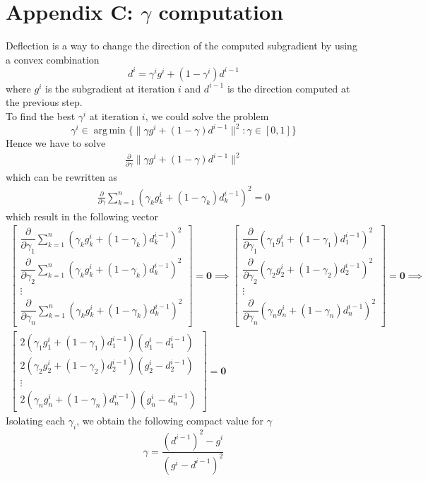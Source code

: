 \documentclass[notitlepage]{article}
\DeclareMathOperator*{\argmin}{arg\,min}
\begin{document}
\section{Appendix C: \texorpdfstring{$\gamma$}{TEXT} computation}
\label{sec:appendix_C}
Deflection is a way to change the direction of the computed subgradient by using a convex combination
\[
  d^i = \gamma^i g^i + (1 - \gamma^i) d^{i-1}   
\]
where $g^i$ is the subgradient at iteration $i$ and $d^{i-1}$ is the direction computed at the previous step.\\
To find the best $\gamma^i$ at iteration $i$, we could solve the problem 
\[
  \gamma^i \in \argmin{ \{ \| \gamma g^i + (1 - \gamma) d^{i-1} \|^2 : \gamma \in \left[0,1\right] \} }   
\]
Hence we have to solve
\begin{align*}
  \frac{\partial}{\partial \gamma} \| \gamma g^i + (1 - \gamma) d^{i-1} \|^2
\end{align*}
which can be rewritten as
\begin{align*}
  \frac{\partial}{\partial \gamma} \sum_{k=1}^n (\gamma_k g_k^i + (1 - \gamma_k) d_k^{i-1})^2 = 0
\end{align*}
which result in the following vector
\begin{gather*}
  \begin{bmatrix}
    \dfrac{\partial}{\partial \gamma_1} \sum_{k=1}^n (\gamma_k g_k^i + (1 - \gamma_k) d_k^{i-1})^2 \\[3ex]
    \dfrac{\partial}{\partial \gamma_2} \sum_{k=1}^n (\gamma_k g_k^i + (1 - \gamma_k) d_k^{i-1})^2 \\[3ex]
    \vdots \\[3ex]
    \dfrac{\partial}{\partial \gamma_n} \sum_{k=1}^n (\gamma_k g_k^i + (1 - \gamma_k) d_k^{i-1})^2
  \end{bmatrix}
  = \boldsymbol{0} \boldsymbol{\implies} 
  \begin{bmatrix}
    \dfrac{\partial}{\partial \gamma_1} (\gamma_1 g_1^i + (1 - \gamma_1) d_1^{i-1})^2 \\[3ex]
    \dfrac{\partial}{\partial \gamma_2} (\gamma_2 g_2^i + (1 - \gamma_2) d_2^{i-1})^2 \\[3ex]
    \vdots \\[3ex]
    \dfrac{\partial}{\partial \gamma_n} (\gamma_n g_n^i + (1 - \gamma_n) d_n^{i-1})^2
  \end{bmatrix}
  = \boldsymbol{0} \boldsymbol{\implies} \\[2ex]
  \begin{bmatrix}
    2 (\gamma_1 g_1^i + (1 - \gamma_1) d_1^{i-1}) (g_1^i - d_1^{i-1}) \\[3ex]
    2 (\gamma_2 g_2^i + (1 - \gamma_2) d_2^{i-1}) (g_2^i - d_2^{i-1}) \\[3ex]
    \vdots \\[3ex]
    2 (\gamma_n g_n^i + (1 - \gamma_n) d_n^{i-1}) (g_n^i - d_n^{i-1})
  \end{bmatrix}
  = \boldsymbol{0}
\end{gather*}
Isolating each $\gamma_i$, we obtain the following compact value for $\gamma$
\[
  \gamma = \dfrac{ (d^{i-1})^2 - g^i }{ (g^i - d^{i-1})^2 }  
\]
\end{document}
